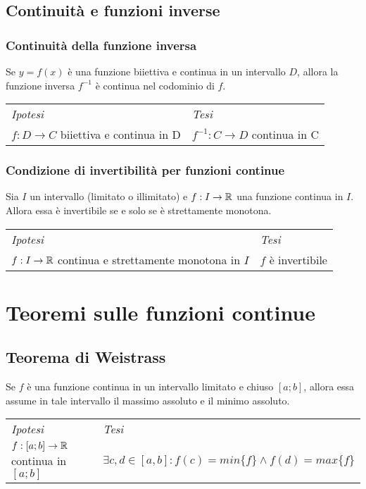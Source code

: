 \subsection{Continuità e funzioni inverse}
    \subsubsection{Continuità della funzione inversa}
        \begin{shadedTheorem}
            Se $y=f(x)$ è una funzione biiettiva e continua in un intervallo $D$, allora la funzione inversa $f^{-1}$ è continua nel codominio di $f$.
        \end{shadedTheorem}
        \begin{tabular}{m{}m{}}
            \textit{Ipotesi} & \textit{Tesi}  \\
            $f:D\to C$ biiettiva e continua in D & $f^{-1}:C\to D$ continua in C 
        \end{tabular}
        
    \subsubsection{Condizione di invertibilità per funzioni continue}
        \begin{shadedTheorem}
            Sia $I$ un intervallo (limitato o illimitato) e $f:I\rightarrow \mathbb{R}$ una funzione continua in $I$. Allora essa è invertibile se e solo se è strettamente monotona.
        \end{shadedTheorem}
        \begin{tabular}{m{}m{}}
            \textit{Ipotesi} & \textit{Tesi}  \\
            $f:I\to \mathbb{R}$ continua e strettamente monotona in $I$ & $f$ è invertibile 
        \end{tabular}
    
\section{Teoremi sulle funzioni continue}
    \subsection{Teorema di Weistrass}
        \begin{shadedTheorem}[Weistrass]
            Se $f$ è una funzione continua in un intervallo limitato e chiuso $[a;b]$, allora essa assume in tale intervallo il massimo assoluto e il minimo assoluto.
        \end{shadedTheorem}
        \begin{tabular}{m{}m{}}
            \textit{Ipotesi} & \textit{Tesi}  \\
            $f:[a;b]\to \mathbb{R}$ continua in $[a;b]$ & $\exists c,d \in [a,b] : f(c) = min\{f\} \land f(d) = max\{f\}$
        \end{tabular}
    
